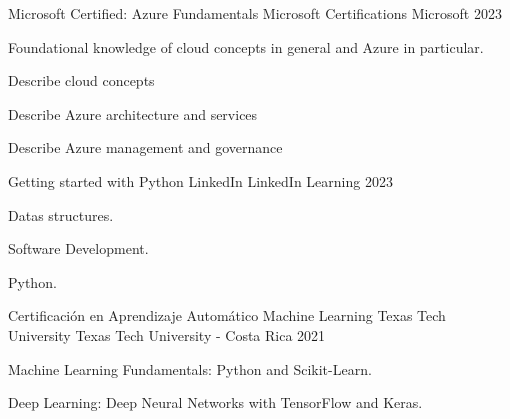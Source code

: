

\begin{cventries}


  \cventry
  {Microsoft Certified: Azure Fundamentals} %
    {Microsoft Certifications} %
    {Microsoft} %
    {2023} %
    {
      \begin{cvitems} %
        \item Foundational knowledge of cloud concepts in general and Azure in
              particular.
        \item Describe cloud concepts
        \item Describe Azure architecture and services
        \item Describe Azure management and governance
      \end{cvitems}
    }
  \cventry
  {Getting started with Python} %
    {LinkedIn} %
    {LinkedIn Learning} %
    {2023} %
    {
      \begin{cvitems} %
        \item Datas structures.
        \item Software Development.
        \item Python.
      \end{cvitems}
    }
  \cventry
    {Certificación en Aprendizaje Automático Machine Learning} %
    {Texas Tech University} %
    {Texas Tech University - Costa Rica} %
    {2021} %
    {
      \begin{cvitems} %
        \item Machine Learning Fundamentals: Python and Scikit-Learn.
        \item Deep Learning: Deep Neural Networks with TensorFlow and Keras.

\end{cvitems}}
\end{cventries}
